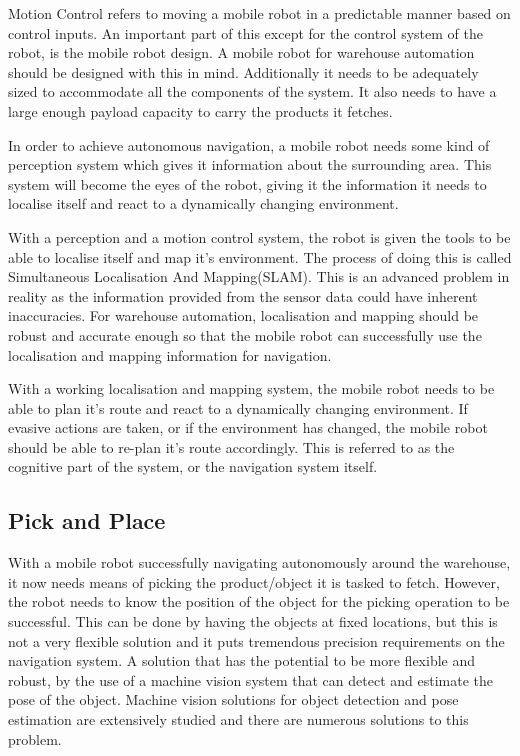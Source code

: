 Motion Control refers to moving a mobile robot in a predictable manner based on control inputs. An important part of this except for the control system of the robot, is the mobile robot design. A mobile robot for warehouse automation should be designed with this in mind. Additionally it needs to be adequately sized  to accommodate all the components of the system.  It also needs to have a large enough payload capacity to carry the products it fetches.

In order to achieve autonomous navigation, a mobile robot needs some kind of perception system which gives it information about the surrounding area. This system will become the eyes of the robot, giving it the information it needs to localise itself and react to a dynamically changing environment.

With a perception and a motion control system, the robot is given the tools to be able to localise itself and map it's environment. The process of doing this is called Simultaneous Localisation And Mapping(SLAM). This is an advanced problem in reality as the information provided from the sensor data could have inherent inaccuracies.  For warehouse automation, localisation and mapping should be robust and accurate enough so that the mobile robot can successfully use the localisation and mapping information for navigation.

With a working localisation and mapping system, the mobile robot needs to be able to plan it's route and react to a dynamically changing environment. If evasive actions are taken, or if the environment has changed, the mobile robot should be able to re-plan it's route accordingly. This is referred to as the cognitive part of the system, or the navigation system itself.

\subsection{Pick and Place} \label{sec:I:PAP}
With a mobile robot successfully navigating autonomously around the warehouse, it now needs means of picking the product/object it is tasked to fetch. However, the robot needs to know the position of the object for the picking operation to be successful. This can be done by having the objects at fixed locations, but this is not a very flexible solution and it puts tremendous precision requirements on the navigation system. A solution that has the potential to be more flexible and robust, by the use of a machine vision system that can detect and estimate the pose of the object. Machine vision solutions for object detection and pose estimation are extensively studied and there are numerous solutions to this problem.

